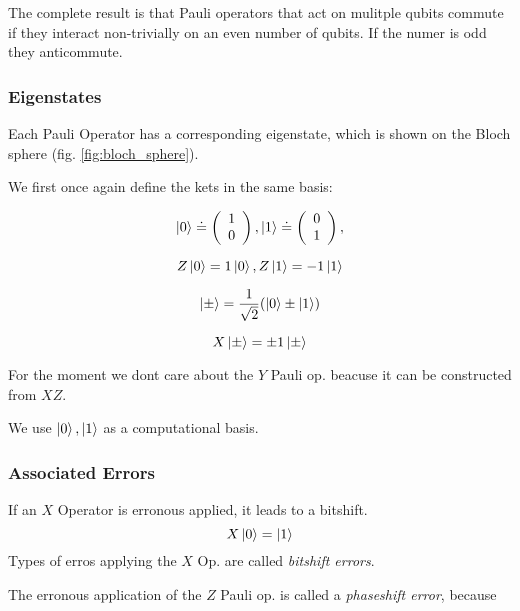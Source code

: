 The complete result is that Pauli operators that act on mulitple qubits commute if they interact non-trivially on an even number of qubits.
If the numer is odd they anticommute.


\subsubsection{Eigenstates}
Each Pauli Operator has a corresponding eigenstate, which is shown on the Bloch sphere (fig. \ref{fig:bloch_sphere}).

We first once again define the kets in the same basis:

\begin{equation}
   \ket{0}  \doteq  \left(\begin{array}{c} 1 \\ 0 \end{array}\right), \ket{1} \doteq \left(\begin{array}{c} 0 \\ 1 \end{array}\right),
\end{equation}

\begin{equation}
    Z \ket{0} = 1 \ket{0}, Z \ket{1} = -1 \ket{1}
\end{equation}

\begin{equation}
    \ket{\pm}  =  \frac{1}{\sqrt{2}}( \ket{0} \pm  \ket{1}) 
\end{equation}

\begin{equation}
   X \ket{\pm} = \pm1 \ket{\pm} 
\end{equation}

For the moment we dont care about the $Y$ Pauli op. beacuse it can be constructed from $XZ$.

We use $\ket{0},\ket{1}$ as a computational basis.


\subsubsection{Associated Errors}
If an $X$ Operator is erronous applied, it leads to a bitshift. 
\begin{equation}
    X\ket{0} = \ket{1}
\end{equation}
Types of erros applying the $X$ Op. are called \textit{bitshift errors}.

The erronous application of the $Z$ Pauli op. is called a \textit{phaseshift error}, because 


